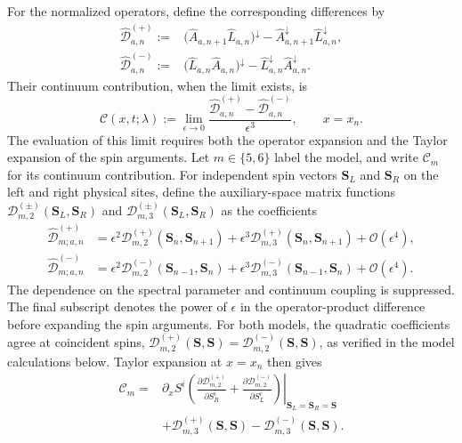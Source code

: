 For the normalized operators, define the corresponding differences by
\begin{align}
\widehat{\mathcal D}^{(+)}_{a,n}
:={}&
\bigl(\widehat{A}_{a,n+1}\widehat L_{a,n}\bigr)^{\downarrow}
-
\widehat{A}_{a,n+1}^{\downarrow}
\widehat L_{a,n}^{\downarrow},
\label{eq:Rplus-hat-definition}\\
\widehat{\mathcal D}^{(-)}_{a,n}
:={}&
\bigl(\widehat L_{a,n}\widehat{A}_{a,n}\bigr)^{\downarrow}
-
\widehat L_{a,n}^{\downarrow}
\widehat{A}_{a,n}^{\downarrow}.
\label{eq:Rminus-hat-definition}
\end{align}
Their continuum contribution, when the limit exists, is
\begin{equation}
\mathcal C(x,t;\lambda)
:=
\lim_{\epsilon\to0}
\frac{
\widehat{\mathcal D}^{(+)}_{a,n}
-
\widehat{\mathcal D}^{(-)}_{a,n}
}{\epsilon^3},
\qquad x=x_n.
\label{eq:C-continuum-definition}
\end{equation}
The evaluation of this limit requires both the operator expansion and
the Taylor expansion of the spin arguments.  Let $m\in\{5,6\}$ label
the model, and write $\mathcal C_m$ for its continuum contribution.
For independent spin vectors $\boldsymbol S_L$ and
$\boldsymbol S_R$ on the left and right physical sites, define the
auxiliary-space matrix functions
$\mathcal D^{(\pm)}_{m,2}(\boldsymbol S_L,\boldsymbol S_R)$ and
$\mathcal D^{(\pm)}_{m,3}(\boldsymbol S_L,\boldsymbol S_R)$ as the coefficients
\begin{align}
\widehat{\mathcal D}^{(+)}_{m;a,n}
&=\epsilon^2\mathcal D^{(+)}_{m,2}
  (\boldsymbol S_n,\boldsymbol S_{n+1})
 +\epsilon^3\mathcal D^{(+)}_{m,3}
  (\boldsymbol S_n,\boldsymbol S_{n+1})
 +\mathcal O(\epsilon^4),
\label{eq:overlap-plus-coefficients}\\
\widehat{\mathcal D}^{(-)}_{m;a,n}
&=\epsilon^2\mathcal D^{(-)}_{m,2}
  (\boldsymbol S_{n-1},\boldsymbol S_n)
 +\epsilon^3\mathcal D^{(-)}_{m,3}
  (\boldsymbol S_{n-1},\boldsymbol S_n)
 +\mathcal O(\epsilon^4).
\label{eq:overlap-minus-coefficients}
\end{align}
The dependence on the spectral parameter and continuum coupling is
suppressed.  The final subscript denotes the power of $\epsilon$ in
the operator-product difference before expanding the spin arguments.
For both models, the quadratic coefficients agree at coincident spins,
$\mathcal D^{(+)}_{m,2}(\boldsymbol S,\boldsymbol S)
=\mathcal D^{(-)}_{m,2}(\boldsymbol S,\boldsymbol S)$,
as verified in the model calculations below.  Taylor expansion at
$x=x_n$ then gives
\begin{align}
\mathcal C_m
={}&\partial_x S^i
\left.
\left(
\frac{\partial\mathcal D^{(+)}_{m,2}}{\partial S_R^i}
+\frac{\partial\mathcal D^{(-)}_{m,2}}{\partial S_L^i}
\right)\right|_{\boldsymbol S_L=\boldsymbol S_R=\boldsymbol S}
\nonumber\\
&+\mathcal D^{(+)}_{m,3}(\boldsymbol S,\boldsymbol S)
 -\mathcal D^{(-)}_{m,3}(\boldsymbol S,\boldsymbol S).
\label{eq:overlap-source-taylor}
\end{align}
